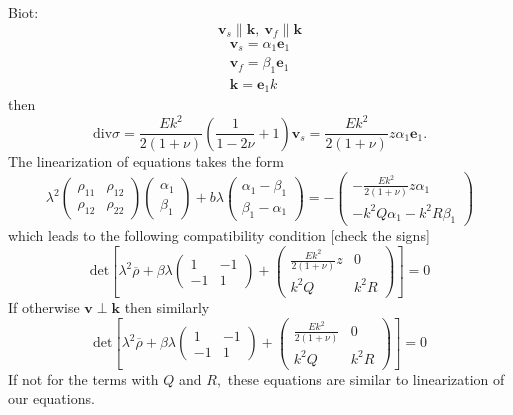 \documentclass[12pt]{article}
\numberwithin{theorem}{section}
\begin{document}
Biot:
\[\mathbf{v}_s \parallel \mathbf{k},\ \mathbf{v}_f \parallel \mathbf{k}\]
\[\begin{array}{l}\mathbf{v}_s = \alpha_1\mathbf{e}_1 \\
\mathbf{v}_f = \beta_1\mathbf{e}_1
\\
\mathbf{k} = \mathbf{e}_1 k
\end{array}\]
then \[\mathrm{div}\sigma =\frac{Ek^2}{2(1+\nu)}\left(\frac1{1-2\nu}+1\right)\mathbf{v}_s=\frac{Ek^2}{2(1+\nu)}z\alpha_1\mathbf{e}_1.\]
The linearization of equations takes the form
\[\lambda^2
\left(\begin{array}{cc}\rho_{11} & \rho_{12}\\ \rho_{12} & \rho_{22}\end{array}\right)\left(\begin{array}{c}\alpha_1\\ \beta_1\end{array}\right)+
b\lambda\left(\begin{array}{c}\alpha_1 - \beta_1\\ \beta_1-\alpha_1\end{array}\right) = -
\left(\begin{array}{c}-\frac{Ek^2}{2(1+\nu)}z\alpha_1\\ -k^2Q\alpha_1 - k^2R\beta_1\end{array}\right)
\]
which leads to the following compatibility condition [check the signs]
\[\mathrm{det}\left[\lambda^2 \overline{\rho} +
\beta\lambda
\left(\begin{array}{cc}1 & -1\\ -1 & 1\end{array}\right)+
\left(\begin{array}{cc}\frac{Ek^2}{2(1+\nu)}z & 0\\ k^2Q & k^2R\end{array}\right)\right]=0\]
If otherwise $\mathbf{v} \perp \mathbf{k}$ then similarly
\[\mathrm{det}\left[\lambda^2 \overline{\rho} +
\beta\lambda
\left(\begin{array}{cc}1 & -1\\ -1 & 1\end{array}\right)+
\left(\begin{array}{cc}\frac{Ek^2}{2(1+\nu)} & 0\\ k^2Q & k^2R\end{array}\right)\right]=0\]
If not for the terms with $Q$ and $R,$ these equations are similar to linearization of our equations.
\end{document}
